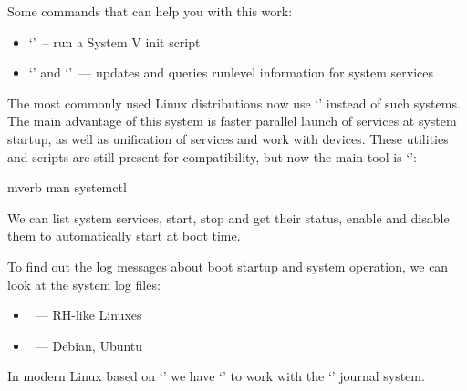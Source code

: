 Some commands that can help you with this work:
\begin{itemize}
\item `'~-- run a System V init script
\item `' and `'~--- updates and queries runlevel
       information for system services
\end{itemize}

The most commonly used Linux distributions now use `' instead of
such systems. The main advantage of this system is faster parallel launch of
services at system startup, as well as unification of services and work with
devices. These utilities and scripts are still present for compatibility,
but now the main tool is `':
\begin{code}{mverb}
man systemctl
\end{code}
We can list system services, start, stop and get their status, enable and
disable them to automatically start at boot time.

To find out the log messages about boot startup and system operation,
we can look at the system log files:
\begin{itemize}
\item {}~--- RH-like Linuxes
\item {}~--- Debian, Ubuntu
\end{itemize}
In modern Linux based on `' we have `'
to work with the `' journal system.
